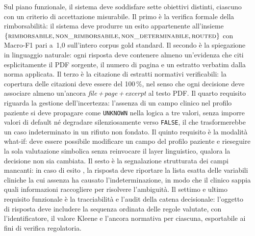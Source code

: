 Sul piano funzionale, il sistema deve soddisfare sette obiettivi distinti,
ciascuno con un criterio di accettazione misurabile.
Il primo è la verifica formale della rimborsabilità: il sistema deve produrre
un esito appartenente all'insieme $\{\textsc{rimborsabile},
\textsc{non\_rimborsabile}, \textsc{non\_determinabile}, \textsc{routed}\}$
con Macro-F1 pari a~1,0 sull'intero corpus gold standard.
Il secondo è la spiegazione in linguaggio naturale: ogni risposta deve contenere
almeno un'evidenza che citi esplicitamente il PDF sorgente, il numero di pagina
e un estratto verbatim dalla norma applicata.
Il terzo è la citazione di estratti normativi verificabili: la copertura
delle citazioni deve essere del 100\,\%, nel senso che ogni decisione deve
associare almeno un'ancora \emph{file\,+\,page\,+\,excerpt} al testo PDF.
Il quarto requisito riguarda la gestione dell'incertezza: l'assenza di un
campo clinico nel profilo paziente si deve propagare come
\texttt{UNKNOWN} nella logica a tre valori, senza imporre valori di default
né degradare silenziosamente verso \texttt{FALSE}, il che trasformerebbe
un caso indeterminato in un rifiuto non fondato.
Il quinto requisito è la modalità what-if: deve essere possibile modificare
un campo del profilo paziente e rieseguire la sola valutazione simbolica
senza reinvocare il layer linguistico, qualora la decisione non sia cambiata.
Il sesto è la segnalazione strutturata dei campi mancanti: in caso di esito
, la risposta deve riportare la lista esatta
delle variabili cliniche la cui assenza ha causato l'indeterminazione,
in modo che il clinico sappia quali informazioni raccogliere per risolvere
l'ambiguità.
Il settimo e ultimo requisito funzionale è la tracciabilità e l'audit
della catena decisionale: l'oggetto di risposta deve includere la sequenza
ordinata delle regole valutate, con l'identificatore, il valore Kleene
e l'ancora normativa per ciascuna, esportabile ai fini di verifica regolatoria.

